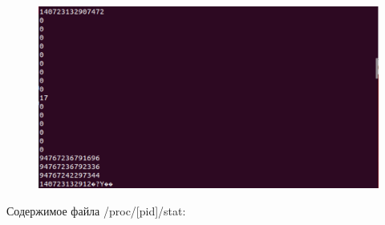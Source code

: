 \documentclass[a4paper,12pt]{article}
\begin{document}
	\begin{figure}[h!]
		\begin{center}
			{\includegraphics[scale = 0.7]{stat2.png}}
			\label{ris:stat2}
		\end{center}
	\end{figure}
	
	\newpage
	
	Содержимое файла /proc/[pid]/stat:
	
\end{document}
